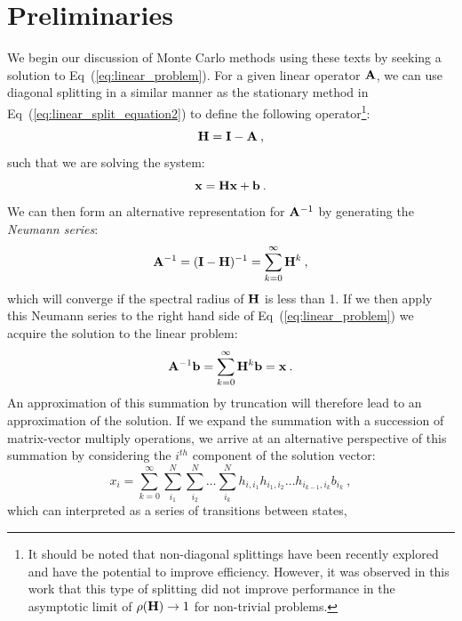 \section{Preliminaries}
\label{sec:mc_preliminaries}
We begin our discussion of Monte Carlo methods using these texts by
seeking a solution to Eq~(\ref{eq:linear_problem}). For a given linear
operator $\mathbf{A}$, we can use diagonal splitting in a similar manner
as the stationary method in Eq~(\ref{eq:linear_split_equation2}) to
define the following operator\footnote{It should be noted that
  non-diagonal splittings have been recently explored
  \citep{srinivasan_monte_2010} and have the potential to improve
  efficiency. However, it was observed in this work that this type of
  splitting did not improve performance in the asymptotic limit of
  $\rho(\mathbf{H}) \rightarrow 1$ for non-trivial problems.}:
\begin{equation}
  \mathbf{H} = \mathbf{I} - \mathbf{A}\:,
  \label{eq:linear_mc_iteration_matrix}
\end{equation}
such that we are solving the system:
\begin{equation}
  \mathbf{x} = \mathbf{H} \mathbf{x} + \mathbf{b}\:.
  \label{eq:richardson_split}
\end{equation}
We can then form an alternative representation for $\mathbf{A}^{-1}$ by
generating the \textit{Neumann series}:
\begin{equation}
  \mathbf{A}^{-1} = (\mathbf{I}-\mathbf{H})^{-1} = \sum_{k=0}^{\infty} \mathbf{H}^k\:,
  \label{eq:neumann_series}
\end{equation}
which will converge if the spectral radius of $\mathbf{H}$ is less than
1. If we then apply this Neumann series to the right hand side of
Eq~(\ref{eq:linear_problem}) we acquire the solution to the linear
problem:
\begin{equation}
  \mathbf{A}^{-1}\mathbf{b} = \sum_{k=0}^{\infty} \mathbf{H}^k\mathbf{b} = \mathbf{x}\:.
  \label{eq:neumann_solution}
\end{equation}
An approximation of this summation by truncation will therefore lead
to an approximation of the solution. If we expand the summation with a
succession of matrix-vector multiply operations, we arrive at an
alternative perspective of this summation by considering the $i^{th}$
component of the solution vector:
\begin{equation}
  x_i = \sum_{k=0}^{\infty}\sum_{i_1}^{N}\sum_{i_2}^{N}\ldots
  \sum_{i_k}^{N}h_{i,i_1}h_{i_1,i_2}\ldots h_{i_{k-1},i_k}b_{i_k}\:,
  \label{eq:expanded_neumann_solution}
\end{equation}
which can interpreted as a series of transitions between states,
